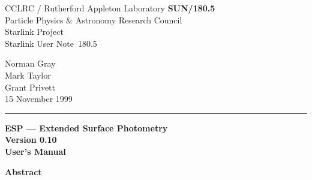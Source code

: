 \documentclass[twoside,11pt]{article}
\newcommand{\stardoccategory}  {Starlink User Note}
\newcommand{\stardocinitials}  {SUN}
\newcommand{\stardocnumber}    {180.5}
\newcommand{\stardocauthors}   {Norman Gray\\Mark Taylor\\Grant Privett}
\newcommand{\stardocdate}      {15 November 1999}
\newcommand{\stardoctitle}     {ESP --- Extended Surface Photometry}
\newcommand{\stardocversion}   {Version 0.10}
\newcommand{\stardocmanual}    {User's Manual}
\newcommand{\stardocname}{\stardocinitials /\stardocnumber}
\newenvironment{latexonly}{}{}
\begin{document}
\thispagestyle{empty}

\begin{latexonly}
   CCLRC / {\sc Rutherford Appleton Laboratory} \hfill {\bf \stardocname}\\
   {\large Particle Physics \& Astronomy Research Council}\\
   {\large Starlink Project\\}
   {\large \stardoccategory\ \stardocnumber}
   \begin{flushright}
   \stardocauthors\\
   \stardocdate
   \end{flushright}
   \vspace{-4mm}
   \rule{\textwidth}{0.5mm}
   \vspace{5mm}
   \begin{center}
   {\Huge\bf  \stardoctitle \\ [2.5ex]}
   {\LARGE\bf \stardocversion \\ [4ex]}
   {\Huge\bf  \stardocmanual}
   \end{center}
   \vspace{5mm}

   \vspace{10mm}
   \begin{center}
      {\Large\bf Abstract}
   \end{center}
\end{latexonly}
\end{document}
